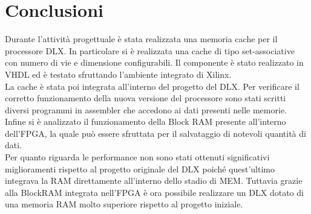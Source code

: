 \clearpage{\pagestyle{empty}\cleardoublepage}
\chapter*{Conclusioni}


Durante l'attivit\`a progettuale \`e stata realizzata una memoria cache per il processore DLX. In particolare si \`e realizzata una cache di tipo set-associative con numero di vie e dimensione configurabili. Il componente \`e stato realizzato in VHDL ed \`e testato sfruttando l'ambiente integrato di Xilinx.\\

La cache \`e stata poi integrata all'interno del progetto del DLX. Per verificare il corretto funzionamento della nuova versione del processore sono stati scritti diversi programmi in assembler che accedono ai dati presenti nelle memorie.\\

Infine si \`e analizzato il funzionamento della Block RAM presente all'interno dell'FPGA, la quale pu\`o essere sfruttata per il salvataggio di notevoli quantit\`a di dati.\\

Per quanto riguarda le performance non sono stati ottenuti significativi miglioramenti rispetto al progetto originale del DLX poich\'e quest'ultimo integrava la RAM direttamente all'interno dello stadio di MEM. Tuttavia grazie alla BlockRAM integrata nell'FPGA \`e ora possibile realizzare un DLX dotato di una memoria RAM molto superiore rispetto al progetto iniziale.